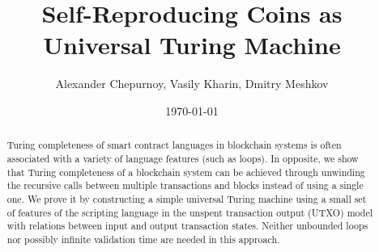 \documentclass[runningheads]{llncs}
\begin{document}
    \title{Self-Reproducing Coins as Universal Turing Machine}

\author{Alexander Chepurnoy, Vasily Kharin, Dmitry Meshkov}


    \date{\today}
    \maketitle

    \begin{abstract}
        Turing completeness of smart contract languages in blockchain
        systems is often associated with a variety of language features
        (such as loops). 
        In opposite, we show that Turing completeness of a blockchain system can
        be achieved through unwinding the recursive calls between
        multiple transactions and blocks instead of using a single one. We prove 
        it by constructing a simple universal Turing machine using
        a small set of features of the scripting language in the unspent
        transaction output (UTXO) model with relations between
        input and output transaction states.
        Neither unbounded loops nor possibly infinite validation time are needed in this approach.

    \end{abstract}
\end{document}
